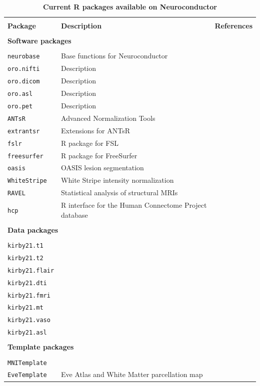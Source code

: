 \documentclass[]{elsarticle} %
\begin{document}
\begin{table}[!ht]
\centering
\caption{\textbf{Current R packages available on Neuroconductor}}\label{tab:packages}
\begin{tabular}{lll}
\hline \\[-2ex]
\textbf{Package} & \textbf{Description}   & \textbf{References} \\
\hline \\ [-1.5ex]
\multicolumn{3}{l}{\textbf{Software packages}}\\
\\ [-1.5ex]
\texttt{neurobase} & Base functions for Neuroconductor  &   \\
\texttt{oro.nifti} & Description  &  \citep{oro} \\
\texttt{oro.dicom} & Description  &  \citep{oro} \\
\texttt{oro.asl} & Description  &   \\
\texttt{oro.pet} & Description  &   \\
\texttt{ANTsR} & Advanced Normalization Tools  & \citep{ants} \\
\texttt{extrantsr} & Extensions for ANTsR  &  \\
\texttt{fslr} & R package for FSL  & \citep{fslr,fsl} \\
\texttt{freesurfer} & R package for FreeSurfer  & \citep{freesurfer} \\
\texttt{oasis} & OASIS lesion segmentation & \citep{oasis}\\
\texttt{WhiteStripe} & White Stripe intensity normalization  & \citep{whitestripe} \\
\texttt{RAVEL} & Statistical analysis of structural MRIs  & \citep{ravel} \\
\texttt{hcp} & R interface for the Human Connectome Project database &  \\
\hline \\ [-1.5ex]
\multicolumn{3}{l}{\textbf{Data packages}}\\
\\ [-1.5ex]
\texttt{kirby21.t1} &   & \citep{kirby}  \\
\texttt{kirby21.t2} &   &  \citep{kirby} \\
\texttt{kirby21.flair} &   &  \citep{kirby} \\
\texttt{kirby21.dti} &   &  \citep{kirby} \\
\texttt{kirby21.fmri} &   &  \citep{kirby} \\
\texttt{kirby21.mt} &   &  \citep{kirby} \\
\texttt{kirby21.vaso} &   &  \citep{kirby} \\
\texttt{kirby21.asl} &   &  \citep{kirby} \\
\hline \\ [-1.5ex]
\multicolumn{3}{l}{\textbf{Template packages}}\\
\\ [-1.5ex]
\texttt{MNITemplate} &   &   \\
\texttt{EveTemplate} & Eve Atlas and White Matter parcellation map  & \citep{eve}  \\
\end{tabular}
\end{table}
\end{document}
